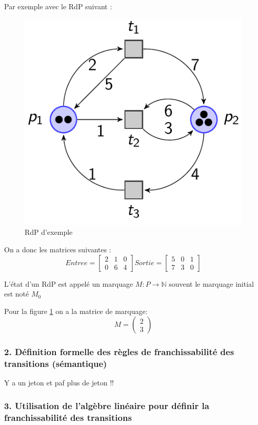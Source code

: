 \documentclass[12pt,a4paper,oneside]{article}
\begin{document}
		Par exemple avec le RdP suivant :

		\begin{figure}[h]
			\includegraphics[scale = 0.5]{./img/exrdp.png}
			\centering
			\caption{RdP d'exemple}
			\label{exrdp}
		\end{figure}

		On a donc les matrices suivantes :
		$$Entree = \begin{bmatrix}
			2 & 1 & 0 \\
			0 & 6 & 4
		\end{bmatrix}
		Sortie = \begin{bmatrix}
			5 & 0 & 1 \\
			7 & 3 & 0
		\end{bmatrix}$$

		L'état d'un RdP est appelé un marquage $M:P\to \mathbb{N}$ souvent le marquage initial est noté $M_0$

		Pour la figure \ref{exrdp} on a la matrice de marquage:
		$$M = \begin{pmatrix}
			2\\
			3
		\end{pmatrix}$$
	\subsubsection*{2. Définition formelle des règles de franchissabilité des transitions (sémantique)}
		Y a un jeton et paf plus de jeton !!

	\subsubsection*{3. Utilisation de l’algèbre linéaire pour définir la franchissabilité des transitions}
\end{document}
